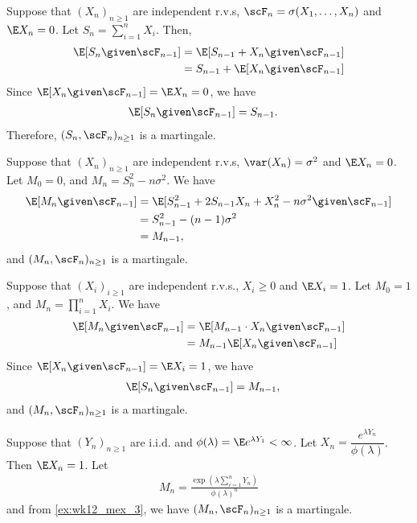 \documentclass[../aipt.tex]{subfiles}
\begin{document}
\begin{Example}\label{ex:wk12_mex_1}
Suppose that $(X_n)_{n\geq1}$ are independent r.v.s, $\scF_n=\sigma(X_1,\ldots,X_n)$ and $\E X_n=0$. Let $S_n=\sum_{i=1}^n X_i$. Then,
\begin{align*}
\E [S_n \given \scF_{n-1}]&= \E [S_{n-1}+X_n \given \scF_{n-1}]\\
&=S_{n-1}+\E [X_n \given \scF_{n-1}]
\end{align*}
Since $\E [X_n \given \scF_{n-1}] = \E X_n =0$, we have
\begin{align*}
\E [S_n \given \scF_{n-1}]&=S_{n-1}.
\end{align*}
Therefore, $(S_{n},\scF_n)_{n\geq1}$ is a martingale.
\end{Example}

\begin{Example}\label{ex:wk12_mex_2}
Suppose that $(X_n)_{n\geq1}$ are independent r.v.s, $\var(X_n)=\sigma^2$ and $\E X_n=0$. Let $M_0=0$, and $M_n=S_n^2-n\sigma^2$. We have
\begin{align*}
\E[M_n \given \scF_{n-1}]
&= \E[S_{n-1}^2 + 2S_{n-1}X_n + X_n^2 - n\sigma^2  \given  \scF_{n-1}]\\
&= S_{n-1}^2 - (n-1)\sigma^2\\
&= M_{n-1},
\end{align*}
and $(M_{n},\scF_n)_{n\geq1}$ is a martingale.
\end{Example}

\begin{Example}\label{ex:wk12_mex_3}
Suppose that $(X_i)_{i\geq1}$ are independent r.v.s., $X_i\geq 0$ and $\E X_i=1$. Let $M_0=1$, and $M_n=\prod_{i=1}^n X_i$. We have
\begin{align*}
\E [M_n \given \scF_{n-1}]&= \E [M_{n-1}\cdot X_n \given \scF_{n-1}]\\
&=M_{n-1} \E [X_n \given \scF_{n-1}]
\end{align*}
Since $\E [X_n \given \scF_{n-1}] = \E X_i =1$, we have
\begin{align*}
\E [S_n \given \scF_{n-1}]&=M_{n-1},
\end{align*}
and $(M_{n},\scF_n)_{n\geq1}$ is a martingale. 
\end{Example}


\begin{Example}\label{ex:wk12_mex_4}
Suppose that $(Y_n)_{n\geq1}$ are i.i.d. and $\phi(\lambda)=\E e^{\lambda Y_1}<\infty$. Let $X_n=\dfrac{e^{\lambda Y_n}}{\phi(\lambda)}$. Then $\E X_n=1$. Let 
\begin{align*}
M_n=\frac{\exp{(\lambda \sum_{i=1}^n Y_n)}}{\phi(\lambda)^n}
\end{align*} 
and from \cref{ex:wk12_mex_3}, we have $(M_{n},\scF_n)_{n\geq1}$ is a martingale.
\end{Example}
\end{document}
